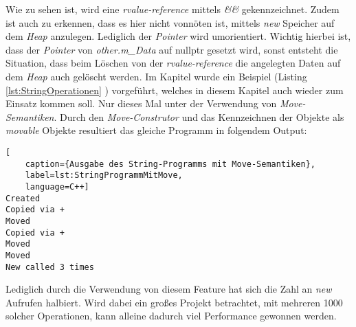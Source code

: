 Wie zu sehen ist, wird eine \emph{rvalue-reference} mittels \emph{\&\&} gekennzeichnet. Zudem ist
auch zu erkennen, dass es hier nicht vonnöten ist, mittels \emph{new} Speicher auf dem \emph{Heap}
anzulegen. Lediglich der \emph{Pointer} wird umorientiert. Wichtig hierbei ist, dass der
\emph{Pointer} von \emph{other.m\_Data} auf nullptr gesetzt wird, sonst entsteht die
Situation, dass beim Löschen von der \emph{rvalue-reference} die angelegten Daten auf dem
\emph{Heap} auch gelöscht werden.
\newline
\newline
Im Kapitel \emph{} wurde ein Beispiel (Listing \ref{lst:StringOperationen}
\emph{}) vorgeführt, welches in diesem Kapitel auch wieder zum
Einsatz kommen soll. Nur dieses Mal unter der Verwendung von \emph{Move-Semantiken}. Durch den
\emph{Move-Construtor} und das Kennzeichnen der Objekte als \emph{movable} Objekte resultiert
das gleiche Programm in folgendem Output:

\begin{lstlisting}[
    caption={Ausgabe des String-Programms mit Move-Semantiken},
    label=lst:StringProgrammMitMove,
    language=C++]
Created
Copied via +
Moved
Copied via +
Moved
Moved
New called 3 times
\end{lstlisting}

Lediglich durch die Verwendung von diesem Feature hat sich die Zahl an \emph{new} Aufrufen halbiert.
Wird dabei ein großes Projekt betrachtet, mit mehreren 1000 solcher Operationen, kann alleine
dadurch viel Performance gewonnen werden.